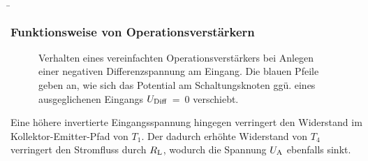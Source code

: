 \begin{frame}
    \b{
        \frametitle{Funktionsweise von Operationsverstärkern}
        \begin{figure}[ht]
            \centering
            \fu{\resizebox{!}{0.7\textheight}{}}
            {Verhalten eines vereinfachten Operationsverstärkers bei Anlegen einer negativen Differenzspannung am Eingang. Die blauen Pfeile geben an, wie sich das Potential am Schaltungsknoten ggü. eines ausgeglichenen Eingangs $U_{\textnormal{Diff}}$~=~0 verschiebt.}
        \end{figure}
        Eine höhere invertierte Eingangsspannung  hingegen verringert den Widerstand im Kollektor-Emitter-Pfad von $T_1$. Der dadurch erhöhte Widerstand von $T_4$ verringert den Stromfluss durch $R_{\textnormal{L}}$, wodurch die Spannung $U_{\textnormal{A}}$ ebenfalls sinkt.
    }
\end{frame}

